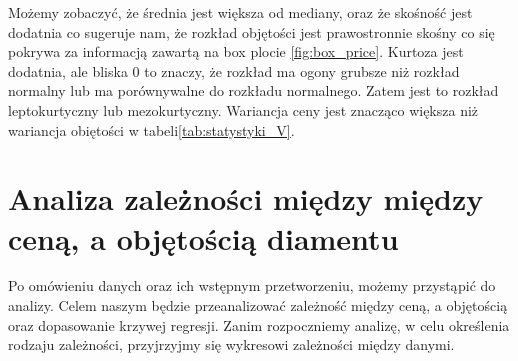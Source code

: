 \documentclass[12pt]{article}
\theoremstyle{exer}
\begin{document}
	\begin{table}[H]
		\caption{Podstawowe statystyki opisowe dla objętości.}
		\label{tab:statystyki_price}
	\end{table}
	Możemy zobaczyć, że średnia jest większa od mediany, oraz że skośność jest dodatnia co sugeruje nam, że rozkład objętości jest prawostronnie skośny co się pokrywa za informacją zawartą na box plocie \ref{fig:box_price}. Kurtoza jest dodatnia, ale bliska $0$ to znaczy, że rozkład ma ogony grubsze niż rozkład normalny lub ma porównywalne do rozkładu normalnego. Zatem jest to rozkład leptokurtyczny lub mezokurtyczny. Wariancja ceny jest znacząco większa niż wariancja obiętości w tabeli\ref{tab:statystyki_V}.  
	
	\section{Analiza zależności między między ceną, a objętością diamentu}
	Po omówieniu danych oraz ich wstępnym przetworzeniu, możemy przystąpić do analizy. Celem naszym będzie przeanalizować zależność między ceną, a objętością oraz dopasowanie krzywej regresji. Zanim rozpoczniemy analizę, w celu określenia rodzaju zależności, przyjrzyjmy się wykresowi zależności między danymi. %
\end{document}
